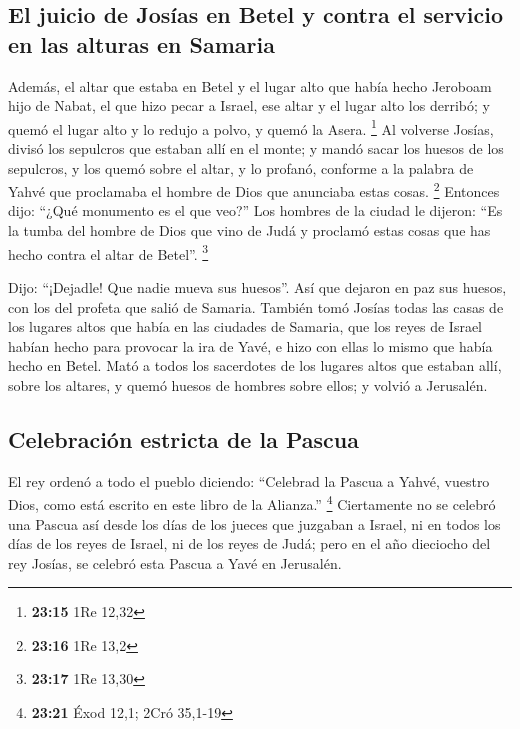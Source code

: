 \begin{paracol}{2}
\hypertarget{el-juicio-de-josuxedas-en-betel-y-contra-el-servicio-en-las-alturas-en-samaria}{%
\subsection{El juicio de Josías en Betel y contra el servicio en las
alturas en
Samaria}\label{el-juicio-de-josuxedas-en-betel-y-contra-el-servicio-en-las-alturas-en-samaria}}

 Además, el altar que estaba en Betel y el lugar alto que
había hecho Jeroboam hijo de Nabat, el que hizo pecar a Israel, ese
altar y el lugar alto los derribó; y quemó el lugar alto y lo redujo a
polvo, y quemó la Asera. \footnote{\textbf{23:15} 1Re 12,32}
 Al volverse Josías, divisó los sepulcros que estaban
allí en el monte; y mandó sacar los huesos de los sepulcros, y los quemó
sobre el altar, y lo profanó, conforme a la palabra de Yahvé que
proclamaba el hombre de Dios que anunciaba estas cosas. \footnote{\textbf{23:16}
  1Re 13,2}  Entonces dijo: ``¿Qué monumento es el que
veo?'' Los hombres de la ciudad le dijeron: ``Es la tumba del hombre de
Dios que vino de Judá y proclamó estas cosas que has hecho contra el
altar de Betel''. \footnote{\textbf{23:17} 1Re 13,30}

 Dijo: ``¡Dejadle! Que nadie mueva sus huesos''. Así que
dejaron en paz sus huesos, con los del profeta que salió de Samaria.
 También tomó Josías todas las casas de los lugares altos
que había en las ciudades de Samaria, que los reyes de Israel habían
hecho para provocar la ira de Yavé, e hizo con ellas lo mismo que había
hecho en Betel.  Mató a todos los sacerdotes de los
lugares altos que estaban allí, sobre los altares, y quemó huesos de
hombres sobre ellos; y volvió a Jerusalén.

\hypertarget{celebraciuxf3n-estricta-de-la-pascua}{%
\subsection{Celebración estricta de la
Pascua}\label{celebraciuxf3n-estricta-de-la-pascua}}

 El rey ordenó a todo el pueblo diciendo: ``Celebrad la
Pascua a Yahvé, vuestro Dios, como está escrito en este libro de la
Alianza.'' \footnote{\textbf{23:21} Éxod 12,1; 2Cró 35,1-19}
 Ciertamente no se celebró una Pascua así desde los días
de los jueces que juzgaban a Israel, ni en todos los días de los reyes
de Israel, ni de los reyes de Judá;  pero en el año
dieciocho del rey Josías, se celebró esta Pascua a Yavé en Jerusalén.


\end{paracol}

